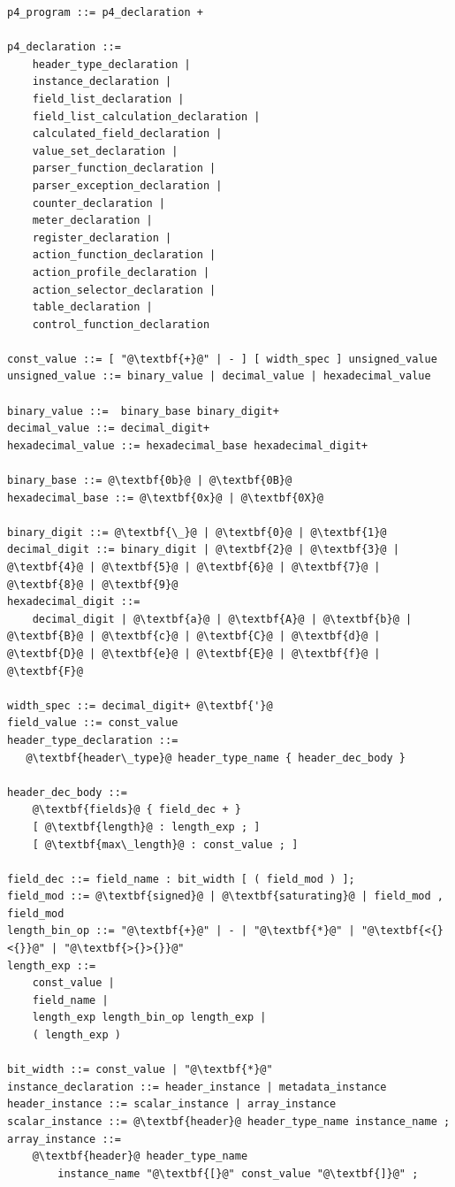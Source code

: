 \documentclass[12pt]{article}
\begin{document}
\begin{lstlisting}[frame=single,backgroundcolor=\color{bnfgreen},escapechar=\@]
p4_program ::= p4_declaration +

p4_declaration ::=
    header_type_declaration | 
    instance_declaration |
    field_list_declaration |
    field_list_calculation_declaration |
    calculated_field_declaration |
    value_set_declaration |
    parser_function_declaration |
    parser_exception_declaration |
    counter_declaration |
    meter_declaration |
    register_declaration |
    action_function_declaration |
    action_profile_declaration |
    action_selector_declaration |
    table_declaration |
    control_function_declaration

const_value ::= [ "@\textbf{+}@" | - ] [ width_spec ] unsigned_value
unsigned_value ::= binary_value | decimal_value | hexadecimal_value

binary_value ::=  binary_base binary_digit+
decimal_value ::= decimal_digit+
hexadecimal_value ::= hexadecimal_base hexadecimal_digit+

binary_base ::= @\textbf{0b}@ | @\textbf{0B}@
hexadecimal_base ::= @\textbf{0x}@ | @\textbf{0X}@

binary_digit ::= @\textbf{\_}@ | @\textbf{0}@ | @\textbf{1}@
decimal_digit ::= binary_digit | @\textbf{2}@ | @\textbf{3}@ | @\textbf{4}@ | @\textbf{5}@ | @\textbf{6}@ | @\textbf{7}@ | @\textbf{8}@ | @\textbf{9}@
hexadecimal_digit ::=
    decimal_digit | @\textbf{a}@ | @\textbf{A}@ | @\textbf{b}@ | @\textbf{B}@ | @\textbf{c}@ | @\textbf{C}@ | @\textbf{d}@ | @\textbf{D}@ | @\textbf{e}@ | @\textbf{E}@ | @\textbf{f}@ | @\textbf{F}@

width_spec ::= decimal_digit+ @\textbf{'}@
field_value ::= const_value
header_type_declaration ::=
   @\textbf{header\_type}@ header_type_name { header_dec_body }

header_dec_body ::=
    @\textbf{fields}@ { field_dec + }
    [ @\textbf{length}@ : length_exp ; ]
    [ @\textbf{max\_length}@ : const_value ; ]

field_dec ::= field_name : bit_width [ ( field_mod ) ];
field_mod ::= @\textbf{signed}@ | @\textbf{saturating}@ | field_mod , field_mod
length_bin_op ::= "@\textbf{+}@" | - | "@\textbf{*}@" | "@\textbf{<{}<{}}@" | "@\textbf{>{}>{}}@"
length_exp ::=
    const_value |
    field_name |
    length_exp length_bin_op length_exp |
    ( length_exp )

bit_width ::= const_value | "@\textbf{*}@"
instance_declaration ::= header_instance | metadata_instance
header_instance ::= scalar_instance | array_instance
scalar_instance ::= @\textbf{header}@ header_type_name instance_name ;
array_instance ::=
    @\textbf{header}@ header_type_name
        instance_name "@\textbf{[}@" const_value "@\textbf{]}@" ;


\end{lstlisting}
\end{document}
